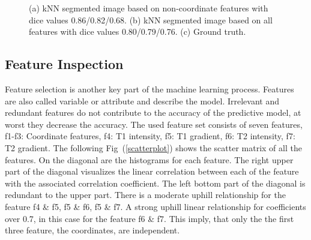 \documentclass[journal]{IEEEtran}
\begin{document}
\begin{figure}
	\centering
	\hfill
	\hfill
	\caption{(a) kNN segmented image based on non-coordinate features with dice values 0.86/0.82/0.68. (b) kNN segmented image based on all features with dice values 0.80/0.79/0.76. (c) Ground truth.}
	\label{f.ground_truth}
\end{figure}

\subsection{Feature Inspection}

Feature selection is another key part of the machine learning process. Features are also called variable or attribute and describe the model. Irrelevant and redundant features do not contribute to the accuracy of the predictive model, at worst they decrease the accuracy. The used feature set consists of seven features, f1-f3: Coordinate features, f4: T1 intensity, f5: T1 gradient, f6: T2 intensity, f7: T2 gradient. The following Fig~(\ref{scatterplot}) shows the scatter matrix of all the features. On the diagonal are the histograms for each feature. The right upper part of the diagonal visualizes the linear correlation between each of the feature with the associated correlation coefficient. The left bottom part of the diagonal is redundant to the upper part. There is a moderate uphill relationship for the feature f4 \& f5, f5 \& f6, f5 \& f7. A strong uphill linear relationship for coefficients over 0.7, in this case for the feature f6 \& f7. This imply, that only the the first three feature, the coordinates, are independent.
\end{document}
